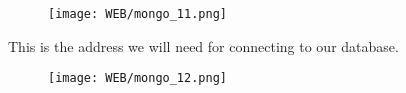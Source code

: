 \documentclass{42-en}
\begin{document}
\begin{figure}[H]
    \begin{center}
        \texttt{[image: WEB/mongo\_11.png]}
    \end{center}
\end{figure}

\newpage
This is the address we will need for connecting to our database.
\begin{figure}[H]
    \begin{center}
        \texttt{[image: WEB/mongo\_12.png]}
    \end{center}
\end{figure}

\end{document}
